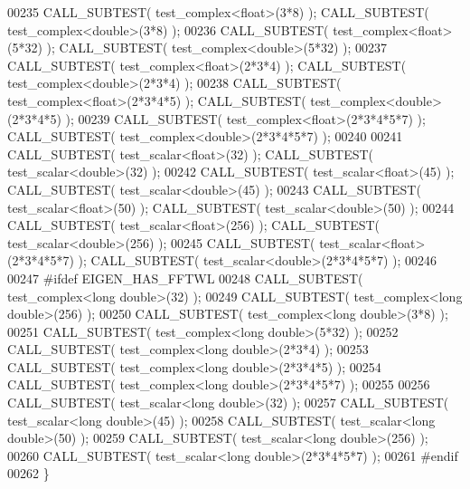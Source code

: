 \begin{DoxyCode}
00235   CALL\_SUBTEST( test\_complex<float>(3*8) ); CALL\_SUBTEST( test\_complex<double>(3*8) ); 
00236   CALL\_SUBTEST( test\_complex<float>(5*32) ); CALL\_SUBTEST( test\_complex<double>(5*32) ); 
00237   CALL\_SUBTEST( test\_complex<float>(2*3*4) ); CALL\_SUBTEST( test\_complex<double>(2*3*4) ); 
00238   CALL\_SUBTEST( test\_complex<float>(2*3*4*5) ); CALL\_SUBTEST( test\_complex<double>(2*3*4*5) ); 
00239   CALL\_SUBTEST( test\_complex<float>(2*3*4*5*7) ); CALL\_SUBTEST( test\_complex<double>(2*3*4*5*7) ); 
00240 
00241   CALL\_SUBTEST( test\_scalar<float>(32) ); CALL\_SUBTEST( test\_scalar<double>(32) ); 
00242   CALL\_SUBTEST( test\_scalar<float>(45) ); CALL\_SUBTEST( test\_scalar<double>(45) ); 
00243   CALL\_SUBTEST( test\_scalar<float>(50) ); CALL\_SUBTEST( test\_scalar<double>(50) ); 
00244   CALL\_SUBTEST( test\_scalar<float>(256) ); CALL\_SUBTEST( test\_scalar<double>(256) ); 
00245   CALL\_SUBTEST( test\_scalar<float>(2*3*4*5*7) ); CALL\_SUBTEST( test\_scalar<double>(2*3*4*5*7) ); 
00246   
00247 \textcolor{preprocessor}{  #ifdef EIGEN\_HAS\_FFTWL}
00248   CALL\_SUBTEST( test\_complex<long double>(32) );
00249   CALL\_SUBTEST( test\_complex<long double>(256) );
00250   CALL\_SUBTEST( test\_complex<long double>(3*8) );
00251   CALL\_SUBTEST( test\_complex<long double>(5*32) );
00252   CALL\_SUBTEST( test\_complex<long double>(2*3*4) );
00253   CALL\_SUBTEST( test\_complex<long double>(2*3*4*5) );
00254   CALL\_SUBTEST( test\_complex<long double>(2*3*4*5*7) );
00255   
00256   CALL\_SUBTEST( test\_scalar<long double>(32) );
00257   CALL\_SUBTEST( test\_scalar<long double>(45) );
00258   CALL\_SUBTEST( test\_scalar<long double>(50) );
00259   CALL\_SUBTEST( test\_scalar<long double>(256) );
00260   CALL\_SUBTEST( test\_scalar<long double>(2*3*4*5*7) );
00261 \textcolor{preprocessor}{  #endif}
00262 \}
\end{DoxyCode}
